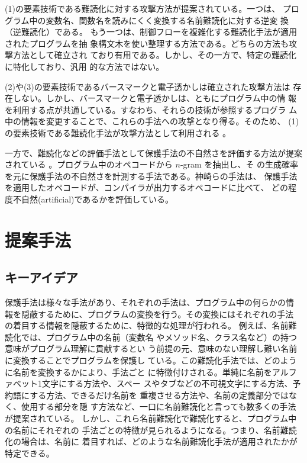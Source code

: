\documentclass[12pt,twoside]{jbook}
\begin{document}
(1)の要素技術である難読化に対する攻撃方法が提案されている。一つは、
プログラム中の変数名、関数名を読みにくく変換する名前難読化に対する逆変
換（逆難読化）である\cite{cimato05jss}。
%
もう一つは、制御フローを複雑化する難読化手法が適用されたプログラムを抽
象構文木を使い整理する方法である。どちらの方法も攻撃方法として確立され
ており有用である。しかし、その一方で、特定の難読化に特化しており、汎用
的な方法ではない。

(2)や(3)の要素技術であるバースマークと電子透かしは確立された攻撃方法は
存在しない。しかし、バースマークと電子透かしは、ともにプログラム中の情
報を利用する点が共通している。すなわち、それらの技術が参照するプログラ
ム中の情報を変更することで、これらの手法への攻撃となり得る。そのため、
(1)の要素技術である難読化手法が攻撃方法として利用される
\cite{tian13hpcc}。

一方で、難読化などの評価手法として保護手法の不自然さを評価する方法が提案されている
\cite{kanzaki14ipsj}。プログラム中のオペコードから $n$-gram を抽出し、そ
の生成確率を元に保護手法の不自然さを計測する手法である。神崎らの手法は、
保護手法を適用したオペコードが、コンパイラが出力するオペコードに比べて、
どの程度不自然(artificial)であるかを評価している。

\chapter{提案手法}\label{sect:proposedmethod}

\section{キーアイデア}
保護手法は様々な手法があり、それぞれの手法は、プログラム中の何らかの情
報を隠蔽するために、プログラムの変換を行う。その変換にはそれぞれの手法
の着目する情報を隠蔽するために、特徴的な処理が行われる。
%
例えば、名前難読化\cite{tyma00patent}では、プログラム中の名前（変数名
  やメソッド名、クラス名など）の持つ意味がプログラム理解に貢献するとい
う前提の元、意味のない理解し難い名前に変換することでプログラムを保護し
ている。この難読化手法では、どのように名前を変換するかにより、手法ごと
に特徴付けされる。単純に名前をアルファベット1文字にする方法や、スペー
スやタブなどの不可視文字にする方法、予約語にする方法、できるだけ名前を
重複させる方法\cite{dasho}や、名前の定義部分ではなく、使用する部分を隠
す方法\cite{tamada07ieice}など、一口に名前難読化と言っても数多くの手法
が提案されている。
%
しかし、これら名前難読化で難読化すると、プログラム中の名前にそれぞれの
手法ごとの特徴が見られるようになる。つまり、名前難読化の場合は、名前に
着目すれば、どのような名前難読化手法が適用されたかが特定できる。
\end{document}
